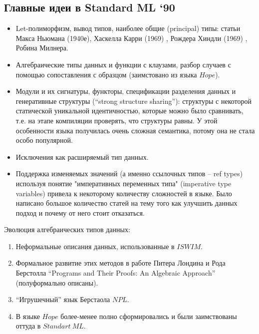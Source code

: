 \documentclass[14pt]{matmex-diploma-custom}
\begin{document}
\subsection{Главные идеи в  Standard ML ‘90}
\begin{itemize}
\item Let-полиморфизм, вывод типов, наиболее общие (principal) типы: статьи Макса Ньюмана (1940е), Хаскелла Карри (1969) \cite{curry1}, Рождера Хиндли (1969) \cite{hindley1}, Робина Милнера\cite{milner1}.
\item Алгебраические типы данных и функции с клаузами, разбор случаев с помощью сопоставления с образцом (заимстовано из языка $Hope$).
\item Модули и их сигнатуры, функторы, спецификации разделения данных и генеративные структуры (“strong structure sharing”): структуры  с  некоторой статической уникальной идентичностью, которые  можно было сравнивать, т.е. на этапе компиляции проверять, что структуры равны. У этой особенности языка получилась очень сложная семантика, потому она не стала особо популярной.
\item Исключения как расширяемый тип данных.
\item Поддержка изменяемых значений (а именно ссылочных типов -- ref types) используя  понятие "императивных переменных типа" (imperative type variables) привела к некоторому количеству сложностей в языке. Было написано большое количество статей на тему того как улучшить данных подход и почему от него стоит отказаться.
\end{itemize}

Эволюция алгебраических типов данных:
\begin{enumerate}
\item Неформальные описания данных, использованные в $I\!SW\!I\!M$.
\item Формальное развитие этих методов в работе Питера Лондина и Рода Берстолла “Programs and Their Proofs: An Algebraic Approach” \cite{laundin5} (полуформально описаны).
\item “Игрушечный” язык Берстаола $N\!P\!L$.
\item В языке $Hope$ более-менее полно сформировались и были заимствованы оттуда в $Standart\ ML$.
\end{enumerate}



\end{document}
